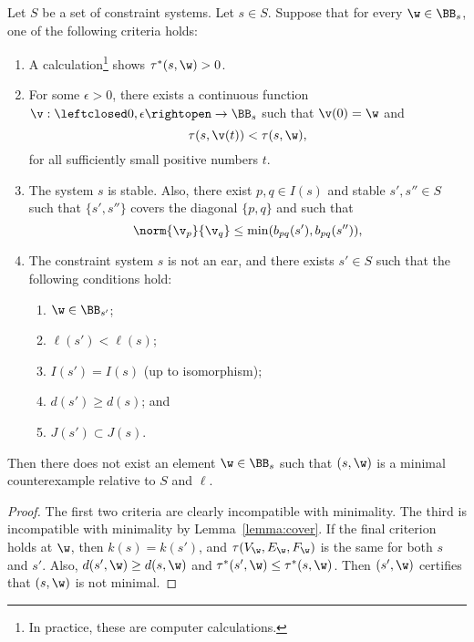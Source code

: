 \begin{lemma}\label{lemma:min-crit} 
Let $S$ be a set of constraint systems.  Let $s\in S$.
Suppose that for every $\w\in\BB_s$, one of the following criteria holds:
\begin{enumerate}
\item {}  A calculation\footnote{In practice, these
  are computer calculations.} shows $\tau^*(s,\w)>0$.
 \item {}  For some $\epsilon>0$, there exists a continuous function 
  $\v:\leftclosed 0,\epsilon\rightopen\to\BB_s$ such that $\v(0)=\w$ and
  \[
  \tau(s,\v(t))<\tau(s,\w),
  \]
  for all sufficiently small positive numbers $t$.
\item {}  The system $s$ is stable.  Also,
there exist $p,q\in I(s)$ and stable $s',s''\in S$ such that
  $\{s',s''\}$ covers the diagonal $\{p,q\}$ and such that
\[
\norm{\v_p}{\v_q}\le \min (b_{pq}(s'),b_{pq}(s'')),
\]
\item {} The constraint system $s$ is not an ear, and
  there exists $s'\in S$ such that the following conditions hold:
  \begin{enumerate}
    \item $\w\in \BB_{s'}$;
    \item $\ell(s')<\ell(s)$;
      \item  $I(s')=I(s)$ (up to isomorphism);
        \item $d(s')\ge d(s)$; and
          \item $J(s')\subset J(s)$.
            \end{enumerate}
\end{enumerate}
Then there does not exist an element $\w\in \BB_s$ such that $(s,\w)$
is a minimal counterexample relative to $S$ and $\ell$.
\end{lemma}
%
%
%

\begin{proof} The first two criteria are clearly incompatible with
  minimality.  The third is incompatible with minimality by
  Lemma~\ref{lemma:cover}.  If the final criterion holds at $\w$, then
  $k(s)=k(s')$, and $\tau(V_\w,E_\w,F_\w)$ is the same for both $s$
  and $s'$.  Also, $d(s',\w)\ge d(s,\w)$ and $\tau^*(s',\w)\le
  \tau^*(s,\w)$.  Then $(s',\w)$ certifies that $(s,\w)$ is not minimal.
\end{proof}

